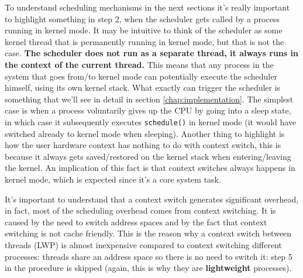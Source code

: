 \documentclass[10pt]{book}
\begin{document}
To understand scheduling mechanisms in the next sections it's really important to highlight something in step 2, when the scheduler gets called by a process running in kernel mode. It may be intuitive to think of the scheduler as some kernel thread that is permanently running in kernel mode, but that is not the case. \textbf{The scheduler does not run as a separate thread, it always runs in the context of the current thread.} This means that any process in the system that goes from/to kernel mode can potentially execute the scheduler himself, using its own kernel stack. What exactly can trigger the scheduler is something that we'll see in detail in section \ref{chap:implementation}. The simplest case is when a process voluntarily gives up the CPU by going into a sleep state, in which case it subsequently executes \verb|schedule()| in kernel mode (it would have switched already to kernel mode when sleeping). %
Another thing to highlight is how the user hardware context has nothing to do with context switch, this is because it always gets saved/restored on the kernel stack when entering/leaving the kernel. An implication of this fact is that context switches always happens in kernel mode, which is expected since it's a core system task.

It's important to understand that a context switch generates significant overhead, in fact, most of the scheduling overhead comes from context switching. It is caused by the need to switch address spaces and by the fact that context switching is not cache friendly. This is the reason why a context switch between threads (LWP) is almost inexpensive compared to context switching different processes: threads share an address space so there is no need to switch it: step 5 in the procedure is skipped (again, this is why they are \textbf{lightweight} processes).
\end{document}
